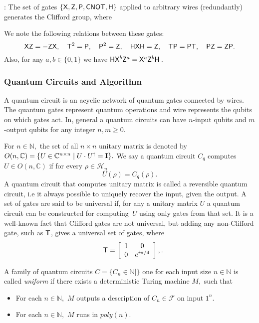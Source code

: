 \begin{definition}
\label{defn:Clifford+T:family}
 : The set of gates $\{{\sf X}, {\sf Z}, {\sf P}, {\sf CNOT},{\sf H}\}$ applied to arbitrary wires (redundantly) generates the Clifford group, where

We note the following relations between these gates:
$${\sf X}{\sf Z} = - {\sf Z}{\sf X},\quad {\sf T}^2={\sf P},\quad{\sf P}^2={\sf Z},\quad{\sf H}{\sf X}{\sf H}={\sf Z},\quad {\sf T}{\sf P}={\sf P}{\sf T},\quad{\sf P}{\sf Z}={\sf Z}{\sf P}.$$
Also, for any $a,b\in\{0,1\}$ we have
${\sf H}{\sf X}^b{\sf Z}^a={\sf X}^a{\sf Z}^b {\sf H}$\,.
\end{definition}

\subsubsection{Quantum Circuits and Algorithm}
A quantum circuit is an acyclic network of quantum gates connected by wires. The quantum gates represent quantum operations and wire represents the qubits on which gates act. In, general a quantum circuits can have $n$-input qubits and $m$-output qubits for any integer $n,m\geq 0.$

For $n\in \mathbb{N},$ the set of all $n\times n$ unitary matrix is denoted by $O(n,\mathbb{C})=\{U\in \mathbb{C}^{n\times n} \mid U\cdot U^\dagger={\bf I}\}.$ We say a quantum circuit $C_q$ computes $U\in O(n,\mathbb{C})$ if for every $\rho\in \mathcal{H}_n$
$$U(\rho )=C_q(\rho).$$
A quantum circuit that computes unitary matrix is called a reversible  quantum circuit, i.e it always possible to uniquely recover the input, given the output. A set of gates are said to be universal if, for any a unitary matrix $U$  a quantum circuit can be constructed for computing~$U$ using only gates from that set. It is a well-known fact that Clifford gates are not universal, but adding any non-Clifford gate, such as ${\sf T}$, gives a universal set of gates, where
$$\quad{\sf T} = \left[\begin{array}{cc} 1 & 0\\ 0 & e^{i\pi/4}\end{array}\right],.$$

A family of quantum circuits $C=\{C_n\in \mathbb{N} \mid \}$ one for each input  size $n\in \mathbb{N}$ is called \emph{uniform} if there exists a deterministic Turing machine $M,$ such that
 \begin{itemize}
 \item For each $n\in\mathbb{N},$ $M$ outputs a description of $C_n \in \mathcal{F}$ on input $1^n.$
 \item  For each $n\in\mathbb{N},$ $M$ runs in $poly(n).$
 \end{itemize}

